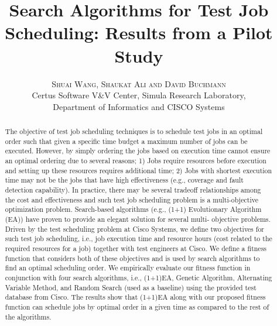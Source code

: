\documentclass[twoside]{article}
\title{\vspace{-15mm}\fontsize{24pt}{10pt}\selectfont
\textbf{Search Algorithms for Test Job Scheduling: Results from a Pilot Study}} %
\author{
\large
\textsc{Shuai Wang, Shaukat Ali and David Buchmann}\\[2mm] %
\normalsize Certus Software V\&V Center, Simula Research Laboratory, \\
\normalsize Department of Informatics and CISCO Systems \\ %
\vspace{-5mm}
}
\date{}
\begin{document}
\maketitle %

\thispagestyle{fancy} %


\begin{abstract}

\noindent The objective of test job scheduling techniques is to schedule test
jobs in an optimal order such that given a specific time budget a maximum
number of jobs can be executed. However, by simply ordering the jobs based on
execution time cannot ensure an optimal ordering due to several reasons; 1)
Jobs require resources before execution and setting up these resources requires
additional time; 2) Jobs with shortest execution time may not be the jobs that
have high effectiveness (e.g., coverage and fault detection capability). In
practice, there may be several tradeoff relationships among the cost and
effectiveness and such test job scheduling problem is a multi-objective
optimization problem. Search-based algorithms (e.g., (1+1) Evolutionary
Algorithm (EA)) have proven to provide an elegant solution for several multi-
objective problems. Driven by the test scheduling problem at Cisco Systems, we
define two objectives for such test job scheduling, i.e., job execution time
and resource hours (cost related to the required resources for a job) together
with test engineers at Cisco. We define a fitness function that considers both
of these objectives and is used by search algorithms to find an optimal
scheduling order. We empirically evaluate our fitness function in conjunction
with four search algorithms, i.e., (1+1)EA, Genetic Algorithm, Alternating
Variable Method, and Random Search (used as a baseline) using the provided test
database from Cisco. The results show that (1+1)EA along with our proposed
fitness function can schedule jobs by optimal order in a given time as compared
to the rest of the algorithms.

\end{abstract}

\end{document}
